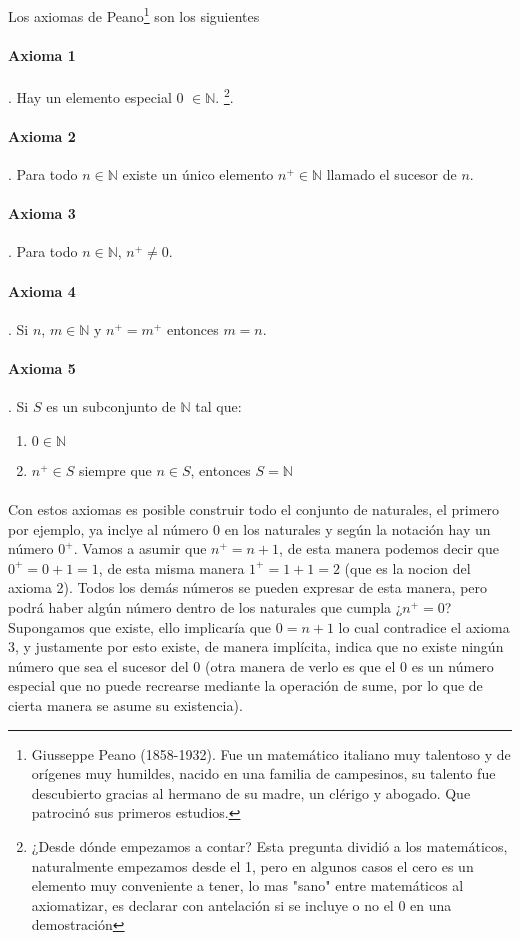 \documentclass{article}
\begin{document}
Los axiomas de Peano\footnote{Giusseppe Peano (1858-1932). Fue un matemático italiano muy talentoso y de orígenes muy humildes, nacido en una familia de campesinos, su talento fue descubierto gracias al hermano de su madre, un clérigo y abogado. Que patrocinó sus primeros estudios.} son los siguientes\cite{tnumprincip_2004}

\paragraph{Axioma 1}. Hay un elemento especial 0 $\in \mathbb{N}$. \footnote{¿Desde dónde empezamos a contar? Esta pregunta dividió a los matemáticos, naturalmente empezamos desde el 1, pero en algunos casos el cero es un elemento muy conveniente a tener, lo mas "sano" entre matemáticos al axiomatizar, es declarar con antelación si se incluye o no el 0 en una demostración}.
\paragraph{Axioma 2}. Para todo $n \in \mathbb{N}$ existe un único elemento $n^+ \in \mathbb{N}$ llamado el sucesor de $n$.
\paragraph{Axioma 3}. Para todo $n \in \mathbb{N}$, $n^+ \neq 0$.
\paragraph{Axioma 4}. Si $n$, $m \in \mathbb{N}$ y $n^+ = m^+$ entonces $m = n$.
\paragraph{Axioma 5}. Si $S$ es un subconjunto de $\mathbb{N}$ tal que:
\begin{enumerate}
    \item $0 \in \mathbb{N}$
    \item $n^+ \in S$ siempre que $n \in S$, entonces $S = \mathbb{N}$
\end{enumerate}

\paragraph{} Con estos axiomas es posible construir todo el conjunto de naturales, el primero por ejemplo, ya inclye al número $0$ en los naturales y según la notación hay un número $0^+$. Vamos a asumir que $n^+ = n + 1$,  de esta manera podemos decir que $0^+ = 0 + 1 = 1$, de esta misma manera $1^+ = 1 + 1 = 2$ (que es la nocion del axioma 2). Todos los demás números se pueden expresar de esta manera, pero podrá haber algún número dentro de los naturales que cumpla ¿$n^+ = 0$? Supongamos que existe, ello implicaría que $0 = n + 1$ lo cual contradice el axioma 3, y justamente por esto existe, de manera implícita, indica que no existe ningún número que sea el sucesor del 0 (otra manera de verlo es que el 0 es un número especial que no puede recrearse mediante la operación de sume, por lo que de cierta manera se asume su existencia).
\end{document}
